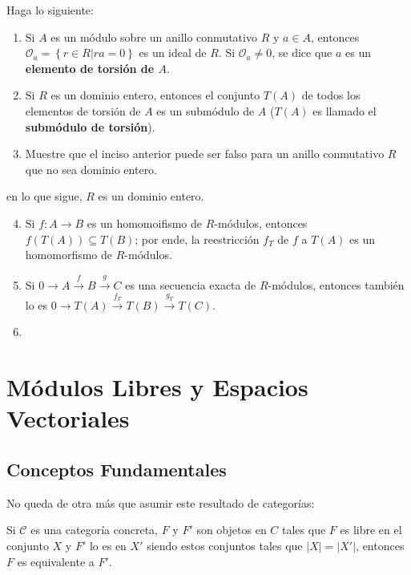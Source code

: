 \documentclass[12pt]{report}
\newcounter{it}
\theoremstyle{largebreak}
\newcommand\abs[1]{\ensuremath{\big|#1\big|}}
\newcommand\cf[3]{\ensuremath{#1:#2\rightarrow#3}}
\begin{document}
    \begin{excer}
        Haga lo siguiente:
        \begin{enumerate}[label = \textit{(\alph*)}]
            \item Si $A$ es un módulo sobre un anillo conmutativo $R$ y $a\in A$, entonces $\mathcal{O}_a=\left\{r\in R\Big|ra=0 \right\}$ es un ideal de $R$. Si $\mathcal{O}_a\neq0$, se dice que $a$ es un \textbf{elemento de torsión de $A$}.
            \item Si $R$ es un dominio entero, entonces el conjunto $T(A)$ de todos los elementos de torsión de $A$ es un submódulo de $A$ ($T(A)$ es llamado el \textbf{submódulo de torsión}).
            \item Muestre que el inciso anterior puede ser falso para un anillo conmutativo $R$ que no sea dominio entero.
        \end{enumerate}
        en lo que sigue, $R$ es un dominio entero.
        \begin{enumerate}[label = \textit{(\alph*)}]
            \setcounter{enumi}{3}
            \item Si $\cf{f}{A}{B}$ es un homomoifismo de $R$-módulos, entonces $f(T(A))\subseteq T(B)$; por ende, la reestricción $f_T$ de $f$ a $T(A)$ es un homomorfismo de $R$-módulos.
            \item Si $0\rightarrow A\overset{f}{\rightarrow}B\overset{g}{\rightarrow}C$ es una secuencia exacta de $R$-módulos, entonces también lo es $0\rightarrow T(A)\overset{f_T}{\rightarrow}T(B)\overset{g_T}{\rightarrow}T(C)$.
            \item 
        \end{enumerate}
    \end{excer}

    \newpage

    \chapter{Módulos Libres y Espacios Vectoriales}

    \section{Conceptos Fundamentales}

    
    
    No queda de otra más que asumir este resultado de categorías:

    \begin{theor}
        Si $\mathcal{C}$ es una categoría concreta, $F$ y $F'$ son objetos en $C$ tales que $F$ es libre en el conjunto $X$ y $F'$ lo es en $X'$ siendo estos conjuntos tales que $\abs{X}=\abs{X'}$, entonces $F$ es equivalente a $F'$.
    \end{theor}
\end{document}
